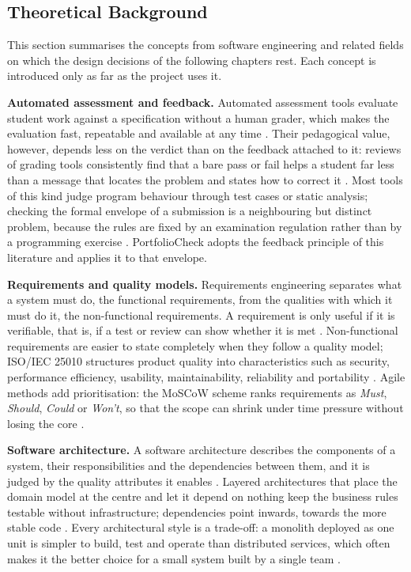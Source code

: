 \documentclass[a4paper,11pt]{article}
\begin{document}
\subsection{Theoretical Background}\label{sec:theory}

This section summarises the concepts from software engineering and related
fields on which the design decisions of the following chapters rest. Each
concept is introduced only as far as the project uses it.

\textbf{Automated assessment and feedback.} Automated assessment tools evaluate
student work against a specification without a human grader, which makes the
evaluation fast, repeatable and available at any time
\citep{Paiva2022}. Their pedagogical value, however, depends less on the
verdict than on the feedback attached to it: reviews of grading tools
consistently find that a bare pass or fail helps a student far less than a
message that locates the problem and states how to correct it
\citep{Messer2024}. Most tools of this kind judge program behaviour through test
cases or static analysis; checking the formal envelope of a submission is a
neighbouring but distinct problem, because the rules are fixed by an
examination regulation rather than by a programming exercise
\citep{Combefis2022}. PortfolioCheck adopts the feedback principle of this
literature and applies it to that envelope.

\textbf{Requirements and quality models.} Requirements engineering separates
what a system must do, the functional requirements, from the qualities with
which it must do it, the non-functional requirements. A requirement is only
useful if it is verifiable, that is, if a test or review can show whether it is
met \citep{Sommerville2020}. Non-functional requirements are easier to state
completely when they follow a quality model; ISO/IEC 25010 structures product
quality into characteristics such as security, performance efficiency,
usability, maintainability, reliability and portability
\citep{ISO25010}. Agile methods add prioritisation: the MoSCoW scheme ranks
requirements as \textit{Must}, \textit{Should}, \textit{Could} or
\textit{Won't}, so that the scope can shrink under time pressure without losing
the core \citep{Ambler2022}.

\textbf{Software architecture.} A software architecture describes the
components of a system, their responsibilities and the dependencies between
them, and it is judged by the quality attributes it enables
\citep{Bass2021}. Layered architectures that place the domain model at the
centre and let it depend on nothing keep the business rules testable without
infrastructure; dependencies point inwards, towards the more stable code
\citep{Percival2020}. Every architectural style is a trade-off: a monolith
deployed as one unit is simpler to build, test and operate than distributed
services, which often makes it the better choice for a small system built by a
single team \citep{Richards2020}.
\end{document}
